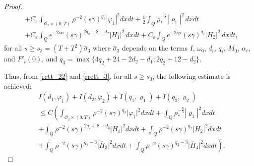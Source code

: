 \documentclass[11pt,a4paper]{amsart}
\numberwithin{equation}{section}
\begin{document}
\begin{proof}
\begin{equation}
\begin{split}
&+C_{\varepsilon}\int_{\mathcal{O}_2\times(0,T)} \rho^{-2} (s \gamma)^{q_3} |\varphi_1|^2 dxdt+\frac{1}{2}\int_{Q}\rho^{-\frac{8}{5}}_{*}|\varrho_1|^{2}\,dxdt\\
&+C_{\varepsilon}\int_{Q}e^{-2s\alpha}(s\gamma)^{2q_{2}+8-d_{2}}|H_{1}|^{2}\,dxdt+C_{\varepsilon}\int_{Q}e^{-2s\sigma}(s\gamma)^{q_2}|H_2|^{2}\,dxdt,
    \end{split}
\end{equation}for all $s\geq s_3 = (T+T^2)\hat{\sigma}_{3}$ where $\hat{\sigma}_{3}$ depends on the terms $I$, $\omega_0$, $d_i$,  $q_i$,  $M_{0}$, $\alpha_{i}$,  and  $F'_{i}(0)$, and  $q_{3}=\max\{4q_{2}+24-2d_{2}-d_{1};2q_{2}+12-d_{2}\}$. 

\noindent Thus, from \eqref{rett_22} and \eqref{rrett_3}, for all $s\geq s_3$, the following estimate is achieved:
\begin{equation}\label{step4-1}
\begin{split}
& I(d_1,\varphi_1) + I(d_2,\varphi_2) +I(q_1,\varrho_1) + I(q_2,\varrho_2)\\
&\leq C\left(\int_{\mathcal{O}_2\times (0,T)}\rho^{-2}(s\gamma)^{q_3}\vert \varphi_1 \vert^2dxdt  +\int_Q \rho^{-\frac{8}{5}}_{*}  |\varrho_1|^2dxdt \right. \\
&+\int_{Q}\rho^{-2}(s\gamma)^{2q_{2}+8-d_{2}}\vert H_1\vert^2dxdt + \int_{Q}\rho^{-2}(s\gamma)^{q_2}\vert H_2\vert^2dxdt\\
&\left. + \int_{Q}\rho^{-2}(s\gamma)^{q_1-3} \vert \overline{H}_3\vert^2  dxdt +\int_{Q}\rho^{-2}(s\gamma)^{q_2-3} \vert \overline{H}_4\vert^2  dxdt \right).
\end{split}
\end{equation}



\end{proof}
\end{document}
